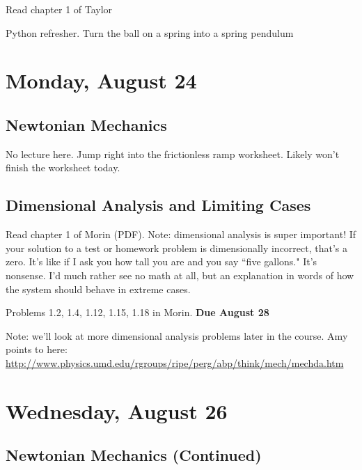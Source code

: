 \documentclass[10pt]{article}
\renewenvironment{quote}{\begin{shaded*}\begin{oldquote}}{\end{oldquote}\end{shaded*}}
\begin{document}
\begin{quote}
    Read chapter 1 of Taylor
\end{quote}

\begin{quote}
    Python refresher. Turn the ball on a spring into a spring pendulum
\end{quote}

\section*{Monday, August 24}

\subsection*{Newtonian Mechanics}

No lecture here. Jump right into the frictionless ramp worksheet. Likely won't finish the worksheet today.

\subsection*{Dimensional Analysis and Limiting Cases}

\begin{quote}
    Read chapter 1 of Morin (PDF). Note: dimensional analysis is super important! If your solution to a test or homework problem is dimensionally incorrect, that's a zero. It's like if I ask you how tall you are and you say ``five gallons." It's nonsense. I'd much rather see no math at all, but an explanation in words of how the system should behave in extreme cases.
\end{quote}

\begin{quote}
    Problems 1.2, 1.4, 1.12, 1.15, 1.18 in Morin. \textbf{Due August 28}
\end{quote}

Note: we'll look at more dimensional analysis problems later in the course. Amy points to here: \url{http://www.physics.umd.edu/rgroups/ripe/perg/abp/think/mech/mechda.htm}

\section*{Wednesday, August 26}

\subsection*{Newtonian Mechanics (Continued)}
\end{document}
